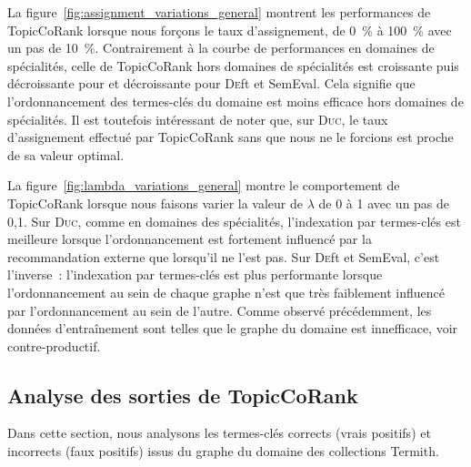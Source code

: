         La figure~\ref{fig:assignment_variations_general} montrent les
        performances de TopicCoRank lorsque nous forçons le taux d'assignement,
        de 0~\% à 100~\% avec un pas de 10~\%. Contrairement à la courbe de
        performances en domaines de spécialités, celle de TopicCoRank hors
        domaines de spécialités est croissante puis décroissante pour 
        et décroissante pour \textsc{De}ft et SemEval. Cela signifie que
        l'ordonnancement des termes-clés du domaine est moins efficace hors
        domaines de spécialités. Il est toutefois intéressant de noter que, sur
        \textsc{Duc}, le taux d'assignement effectué par TopicCoRank sans que
        nous ne le forcions est proche de sa valeur optimal.
        

        La figure~\ref{fig:lambda_variations_general} montre le comportement de
        TopicCoRank lorsque nous faisons varier la valeur de $\lambda$ de 0 à 1
        avec un pas de 0,1. Sur \textsc{Duc}, comme en domaines des spécialités,
        l'indexation par termes-clés est meilleure lorsque l'ordonnancement est
        fortement influencé par la recommandation externe que lorsqu'il ne l'est
        pas. Sur \textsc{De}ft et SemEval, c'est l'inverse~: l'indexation par
        termes-clés est plus performante lorsque l'ordonnancement au sein de
        chaque graphe n'est que très faiblement influencé par l'ordonnancement
        au sein de l'autre. Comme observé précédemment, les données
        d'entraînement sont telles que le graphe du domaine est innefficace,
        voir contre-productif.
        

    \subsection{Analyse des sorties de TopicCoRank}
    \label{subsec:main-domain_specific_keyphrase_annotation-supervised_automatic_keyphrase_annotation-error_analysis}
      Dans cette section, nous analysons les termes-clés corrects (vrais
      positifs) et incorrects (faux positifs) issus du graphe du domaine des
      collections Termith.

